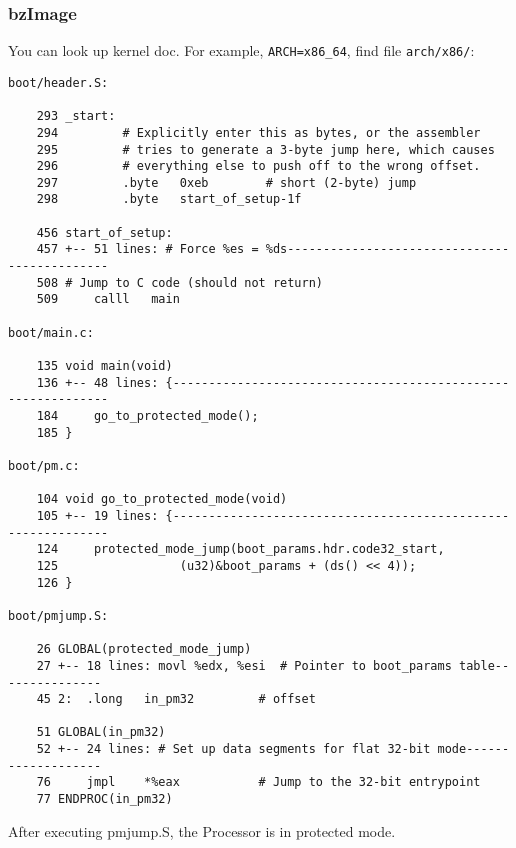 \subsubsection{bzImage}
You can look up kernel doc\cite{bib:linux.doc.boot}.
For example, \texttt{ARCH=x86\_64}, find file \texttt{arch/x86/}:
\begin{framed}\begin{verbatim}
boot/header.S:

    293 _start:
    294         # Explicitly enter this as bytes, or the assembler
    295         # tries to generate a 3-byte jump here, which causes
    296         # everything else to push off to the wrong offset.
    297         .byte   0xeb        # short (2-byte) jump
    298         .byte   start_of_setup-1f

    456 start_of_setup:
    457 +-- 51 lines: # Force %es = %ds---------------------------------------------
    508 # Jump to C code (should not return)
    509     calll   main

boot/main.c:

    135 void main(void)
    136 +-- 48 lines: {-------------------------------------------------------------
    184     go_to_protected_mode();
    185 }   

boot/pm.c:

    104 void go_to_protected_mode(void)
    105 +-- 19 lines: {-------------------------------------------------------------
    124     protected_mode_jump(boot_params.hdr.code32_start,
    125                 (u32)&boot_params + (ds() << 4));
    126 }

boot/pmjump.S:
    
    26 GLOBAL(protected_mode_jump)
    27 +-- 18 lines: movl %edx, %esi  # Pointer to boot_params table---------------
    45 2:  .long   in_pm32         # offset

    51 GLOBAL(in_pm32)
    52 +-- 24 lines: # Set up data segments for flat 32-bit mode-------------------
    76     jmpl    *%eax           # Jump to the 32-bit entrypoint
    77 ENDPROC(in_pm32)
\end{verbatim}\end{framed}
After executing pmjump.S, the Processor is in protected mode.

